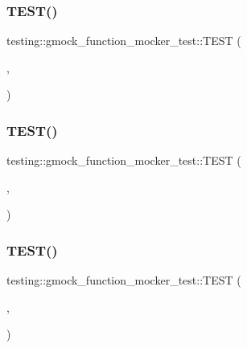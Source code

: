 \subsubsection{\texorpdfstring{TEST()}{TEST()}\hspace{0.1cm}{\footnotesize\ttfamily [8/14]}}
{\footnotesize\ttfamily testing\+::gmock\+\_\+function\+\_\+mocker\+\_\+test\+::\+T\+E\+ST (\begin{DoxyParamCaption}\item[{Mock\+Method\+Mock\+Function\+Test}]{,  }\item[{Works\+For\+Void\+Unary}]{ }\end{DoxyParamCaption})}

\mbox{\label{namespacetesting_1_1gmock__function__mocker__test_a31ed39f17667619d800693a7eb90682e}} 
\subsubsection{\texorpdfstring{TEST()}{TEST()}\hspace{0.1cm}{\footnotesize\ttfamily [9/14]}}
{\footnotesize\ttfamily testing\+::gmock\+\_\+function\+\_\+mocker\+\_\+test\+::\+T\+E\+ST (\begin{DoxyParamCaption}\item[{Mock\+Method\+Mock\+Function\+Test}]{,  }\item[{Works\+For\+Non\+Void\+Binary}]{ }\end{DoxyParamCaption})}

\mbox{\label{namespacetesting_1_1gmock__function__mocker__test_a3396573237c21c4c397152bcfbb3beff}} 
\subsubsection{\texorpdfstring{TEST()}{TEST()}\hspace{0.1cm}{\footnotesize\ttfamily [10/14]}}
{\footnotesize\ttfamily testing\+::gmock\+\_\+function\+\_\+mocker\+\_\+test\+::\+T\+E\+ST (\begin{DoxyParamCaption}\item[{Mock\+Method\+Mock\+Function\+Test}]{,  }\item[{Works\+For10\+Arguments}]{ }\end{DoxyParamCaption})}

